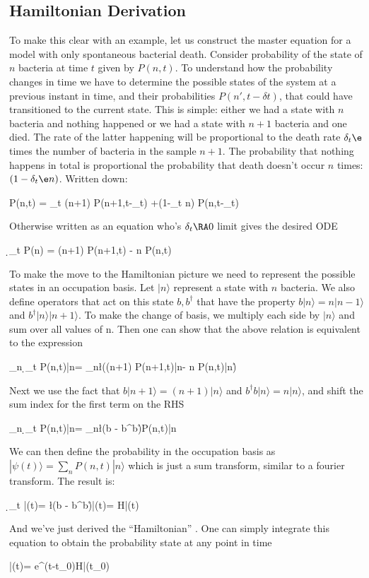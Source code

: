 \documentclass[aps,prx,groupedaddress,notitlepage]{revtex4-1} %
\begin{document}
\subsection{Hamiltonian Derivation}
To make this clear with an example, let us construct the master equation for a model with only spontaneous bacterial death. Consider probability of the state of $n$ bacteria at time $t$ given by $P(n,t)$. To understand how the probability changes in time we have to determine the possible states of the system at a previous instant in time, and their probabilities $P(n',t-\delta t)$, that could have transitioned to the current state. This is simple: either we had a state with $n$ bacteria and nothing happened or we had a state with $n+1$ bacteria and one died. The rate of the latter happening will be proportional to the death rate $\delta_t\e$ times the number of bacteria in the sample $n+1$. The probability that nothing happens in total is proportional the probability that death doesn't occur $n$ times: $(1-\delta_t\e n)$. Written down:
	\begin{align**}
	P(n,t) = \delta_t \e (n+1) P(n+1,t-\delta_t) +(1-\delta_t \e n)  P(n,t-\delta_t) 
		\end{align**}
Otherwise written as an equation who's $\delta_t\RA 0$ limit gives the desired ODE
	\begin{align**}
	 \approx \d_t P(n) = \e (n+1) P(n+1,t) - \e n P(n,t)
	\end{align**}
To make the move to the Hamiltonian picture we need to represent the possible states in an occupation basis. Let $|n\rangle$ represent a state with $n$ bacteria. We also define operators that act on this state $b,b^\dag$ that have the property $b|n\rangle = n|n-1\rangle$ and $b^\dag|n\rangle |n+1\rangle$. To make the change of basis, we multiply each side by $|n\rangle$ and sum over all values of n. Then one can show that the above relation is equivalent to the expression
	\begin{align**}
	\sum_n \d_t P(n,t)|n\rangle = \sum_n\l(\e (n+1) P(n+1,t)|n\rangle - \e n P(n,t)|n\rangle\r)
	\end{align**}
Next we use the fact that $b|n+1\rangle = (n+1)|n\rangle$ and $b^\dag b|n\rangle = n|n\rangle$, and shift the sum index for the first term on the RHS
 	\begin{align**}
 	\sum_n \d_t P(n,t)|n\rangle = \sum_n\l(\e b  - \e b^\dag b\r)P(n,t)|n\rangle
 	\end{align**}
We can then define the probability in the occupation basis as $|\psi(t)\rangle = \sum_n P(n,t)|n\rangle$ which is just a sum transform, similar to a fourier transform. The result is:
		\begin{align**}
	 	 \d_t |\psi(t)\rangle = \l(\e b  - \e b^\dag b\r)|\psi(t)\rangle = H|\psi(t)\rangle
	 	\end{align**}
And we've just derived the ``Hamiltonian'' . One can simply integrate this equation to obtain the probability state at any point in time
	\begin{align**}
	|\psi(t)\rangle = e^{(t-t_0)H}|\psi(t_0)\rangle
	\end{align**} 
\end{document}
